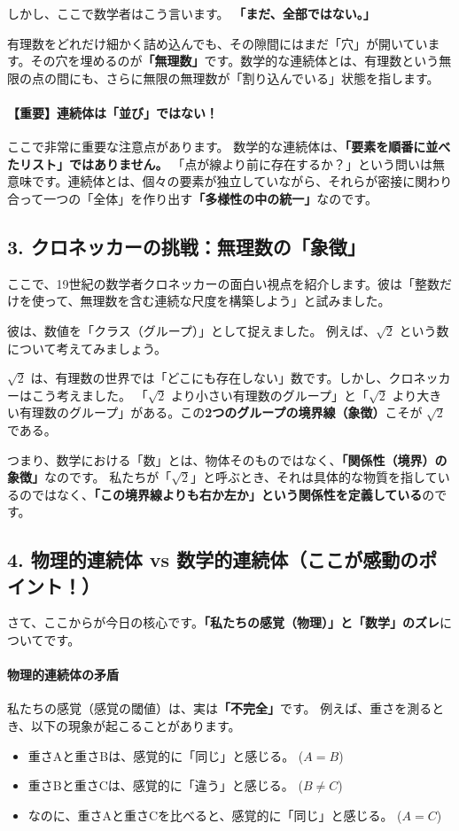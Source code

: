 \documentclass[a4paper,11pt,openany]{ltjsbook}
\begin{document}
\begin{lecturebox}
しかし、ここで数学者はこう言います。
\textbf{「まだ、全部ではない。」}

有理数をどれだけ細かく詰め込んでも、その隙間にはまだ「穴」が開いています。その穴を埋めるのが\textbf{「無理数」}です。数学的な連続体とは、有理数という無限の点の間にも、さらに無限の無理数が「割り込んでいる」状態を指します。

\paragraph{【重要】連続体は「並び」ではない！}
ここで非常に重要な注意点があります。
数学的な連続体は、\textbf{「要素を順番に並べたリスト」ではありません。}
「点が線より前に存在するか？」という問いは無意味です。連続体とは、個々の要素が独立していながら、それらが密接に関わり合って一つの「全体」を作り出す\textbf{「多様性の中の統一」}なのです。

\subsection*{3. クロネッカーの挑戦：無理数の「象徴」}

ここで、19世紀の数学者クロネッカーの面白い視点を紹介します。彼は「整数だけを使って、無理数を含む連続な尺度を構築しよう」と試みました。

彼は、数値を「クラス（グループ）」として捉えました。
例えば、$\sqrt{2}$ という数について考えてみましょう。

$\sqrt{2}$ は、有理数の世界では「どこにも存在しない」数です。しかし、クロネッカーはこう考えました。
「$\sqrt{2}$ より小さい有理数のグループ」と「$\sqrt{2}$ より大きい有理数のグループ」がある。この\textbf{2つのグループの境界線（象徴）}こそが $\sqrt{2}$ である。

つまり、数学における「数」とは、物体そのものではなく、\textbf{「関係性（境界）の象徴」}なのです。
私たちが「$\sqrt{2}$」と呼ぶとき、それは具体的な物質を指しているのではなく、\textbf{「この境界線よりも右か左か」という関係性を定義している}のです。

\subsection*{4. 物理的連続体 vs 数学的連続体（ここが感動のポイント！）}

さて、ここからが今日の核心です。\textbf{「私たちの感覚（物理）」と「数学」のズレ}についてです。

\paragraph{物理的連続体の矛盾}
私たちの感覚（感覚の閾値）は、実は\textbf{「不完全」}です。
例えば、重さを測るとき、以下の現象が起こることがあります。
\begin{itemize}[leftmargin=2em]
\item 重さAと重さBは、感覚的に「同じ」と感じる。 ($A = B$)
\item 重さBと重さCは、感覚的に「違う」と感じる。 ($B \neq C$)
\item なのに、重さAと重さCを比べると、感覚的に「同じ」と感じる。 ($A = C$)
\end{itemize}


\end{lecturebox}
\end{document}
